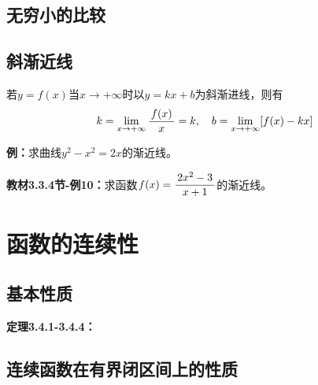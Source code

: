 \subsection{无穷小的比较}



\subsection{斜渐近线}

若$y=f(x)$当$x\to+\infty$时以$y=kx+b$为斜渐进线，则有
$$k=\lim\limits_{x\to{+\infty}}\displaystyle\frac{\,{f(x)}\,}{\,{x}\,}=k,\quad b=\lim\limits_{x\to{+\infty}}[f(x)-kx]$$

{\bf 例：}求曲线$y^2-x^2=2x$的渐近线。

{\bf 教材3.3.4节-例10：}求函数$f(x)=\displaystyle\frac{\,{2x^2-3}\,}{\,{x+1}\,}$的渐近线。

\begin{center}
\end{center}

\section{函数的连续性}



\subsection{基本性质}

{\bf 定理3.4.1-3.4.4：}


\subsection{连续函数在有界闭区间上的性质}

